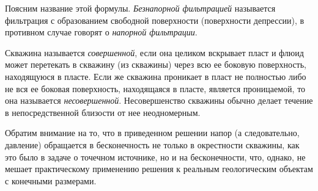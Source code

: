 Поясним название этой формулы. \textit{Безнапорной фильтрацией} называется фильтрация с образованием свободной поверхности (поверхности депрессии), в противном случае говорят о \textit{напорной фильтрации}.

Скважина называется \textit{совершенной}, если она целиком вскрывает пласт и флюид может перетекать в скважину (из скважины) через всю ее боковую поверхность, находящуюся в пласте. Если же скважина проникает в пласт не полностью либо не вся ее боковая поверхность, находящаяся в пласте, является проницаемой, то она называется \textit{несовершенной}. Несовершенство скважины обычно делает течение в непосредственной близости от нее неодномерным.

Обратим внимание на то, что в приведенном решении напор (а следовательно, давление) обращается в бесконечность не только в окрестности скважины, как это было в задаче о точечном источнике, но и на бесконечности, что, однако, не мешает практическому применению решения к реальным геологическим объектам с конечными размерами.

